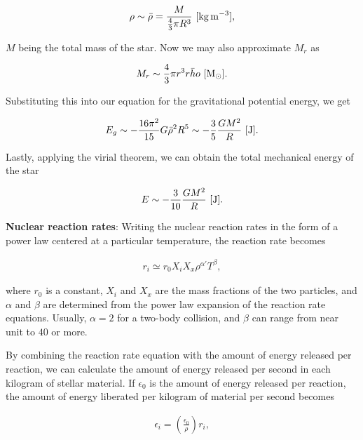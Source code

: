 \documentclass[a4paper,10pt]{article}
\begin{document}
\begin{align*}
    \rho \sim \bar{\rho} = \frac{M}{\frac{4}{3}\pi R^3} ~ [{\rm kg\,m^{-3}}],
\end{align*}

{\noindent}$M$ being the total mass of the star. Now we may also approximate $M_r$ as

\begin{align*}
    M_r \sim \frac{4}{3} \pi r^3 \bar{rho} ~ [{\rm M_\odot}].
\end{align*}

{\noindent}Substituting this into our equation for the gravitational potential energy, we get

\begin{align*}
    E_g \sim -\frac{16\pi^2}{15}G\bar{\rho}^2R^5 \sim -\frac{3}{5}\frac{GM^2}{R} ~ [{\rm J}].
\end{align*}

{\noindent}Lastly, applying the virial theorem, we can obtain the total mechanical energy of the star

\begin{align*}
    E \sim -\frac{3}{10}\frac{GM^2}{R} ~ [{\rm J}].
\end{align*}

{\noindent}\textbf{Nuclear reaction rates}: Writing the nuclear reaction rates in the form of a power law centered at a particular temperature, the reaction rate becomes


\begin{align*}
    r_i \simeq r_0X_iX_x\rho^{\alpha'} T^\beta,
\end{align*}

{\noindent}where $r_0$ is a constant, $X_i$ and $X_x$ are the mass fractions of the two particles, and $\alpha$ and $\beta$ are determined from the power law expansion of the reaction rate equations. Usually, $\alpha=2$ for a two-body collision, and $\beta$ can range from near unit to $40$ or more.

{\noindent}By combining the reaction rate equation with the amount of energy released per reaction, we can calculate the amount of energy released per second in each kilogram of stellar material. If $\epsilon_0$ is the amount of energy released per reaction, the amount of energy liberated per kilogram of material per second becomes

\begin{align*}
    \epsilon_i = \left(\frac{\epsilon_0}{\rho}\right) r_i,
\end{align*}
\end{document}
